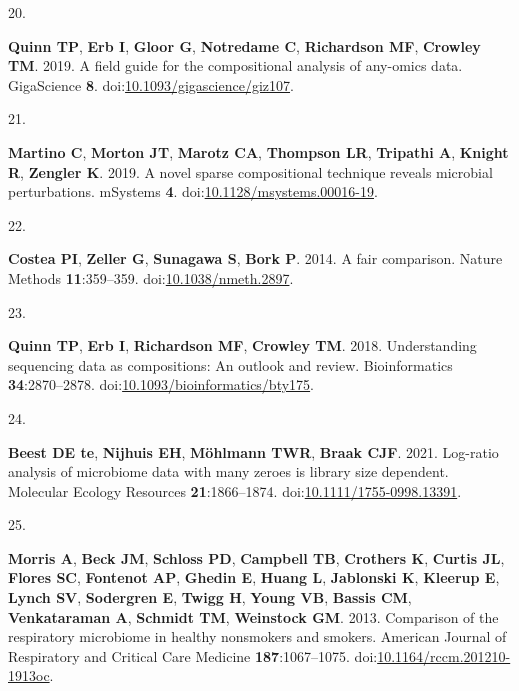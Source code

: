 \documentclass[
]{article}
\newlength{\cslhangindent}
\newlength{\csllabelwidth}
\newlength{\cslentryspacingunit} %
\newenvironment{CSLReferences}[2] %
 {%
  \setlength{\parindent}{0pt}
  \ifodd #1
  \let\oldpar\par
  \def\par{\hangindent=\cslhangindent\oldpar}
  \fi
  \setlength{\parskip}{#2\cslentryspacingunit}
 }%
 {}
\newcommand{\CSLLeftMargin}[1]{\parbox[t]{\csllabelwidth}{#1}}
\newcommand{\CSLRightInline}[1]{\parbox[t]{\linewidth - \csllabelwidth}{#1}\break}
\begin{document}
\begin{CSLReferences}{0}{1}
\leavevmode{}%
\CSLLeftMargin{20. }%
\CSLRightInline{\textbf{Quinn TP}, \textbf{Erb I}, \textbf{Gloor G},
\textbf{Notredame C}, \textbf{Richardson MF}, \textbf{Crowley TM}. 2019.
A field guide for the compositional analysis of any-omics data.
{GigaScience} \textbf{8}.
doi:\href{https://doi.org/10.1093/gigascience/giz107}{10.1093/gigascience/giz107}.}

\leavevmode{}%
\CSLLeftMargin{21. }%
\CSLRightInline{\textbf{Martino C}, \textbf{Morton JT}, \textbf{Marotz
CA}, \textbf{Thompson LR}, \textbf{Tripathi A}, \textbf{Knight R},
\textbf{Zengler K}. 2019. A novel sparse compositional technique reveals
microbial perturbations. {mSystems} \textbf{4}.
doi:\href{https://doi.org/10.1128/msystems.00016-19}{10.1128/msystems.00016-19}.}

\leavevmode{}%
\CSLLeftMargin{22. }%
\CSLRightInline{\textbf{Costea PI}, \textbf{Zeller G}, \textbf{Sunagawa
S}, \textbf{Bork P}. 2014. A fair comparison. Nature Methods
\textbf{11}:359--359.
doi:\href{https://doi.org/10.1038/nmeth.2897}{10.1038/nmeth.2897}.}

\leavevmode{}%
\CSLLeftMargin{23. }%
\CSLRightInline{\textbf{Quinn TP}, \textbf{Erb I}, \textbf{Richardson
MF}, \textbf{Crowley TM}. 2018. Understanding sequencing data as
compositions: An outlook and review. Bioinformatics
\textbf{34}:2870--2878.
doi:\href{https://doi.org/10.1093/bioinformatics/bty175}{10.1093/bioinformatics/bty175}.}

\leavevmode{}%
\CSLLeftMargin{24. }%
\CSLRightInline{\textbf{Beest DE te}, \textbf{Nijhuis EH},
\textbf{Möhlmann TWR}, \textbf{Braak CJF}. 2021. Log-ratio analysis of
microbiome data with many zeroes is library size dependent. Molecular
Ecology Resources \textbf{21}:1866--1874.
doi:\href{https://doi.org/10.1111/1755-0998.13391}{10.1111/1755-0998.13391}.}

\leavevmode{}%
\CSLLeftMargin{25. }%
\CSLRightInline{\textbf{Morris A}, \textbf{Beck JM}, \textbf{Schloss
PD}, \textbf{Campbell TB}, \textbf{Crothers K}, \textbf{Curtis JL},
\textbf{Flores SC}, \textbf{Fontenot AP}, \textbf{Ghedin E},
\textbf{Huang L}, \textbf{Jablonski K}, \textbf{Kleerup E},
\textbf{Lynch SV}, \textbf{Sodergren E}, \textbf{Twigg H}, \textbf{Young
VB}, \textbf{Bassis CM}, \textbf{Venkataraman A}, \textbf{Schmidt TM},
\textbf{Weinstock GM}. 2013. Comparison of the respiratory microbiome in
healthy nonsmokers and smokers. American Journal of Respiratory and
Critical Care Medicine \textbf{187}:1067--1075.
doi:\href{https://doi.org/10.1164/rccm.201210-1913oc}{10.1164/rccm.201210-1913oc}.}


\end{CSLReferences}
\end{document}
